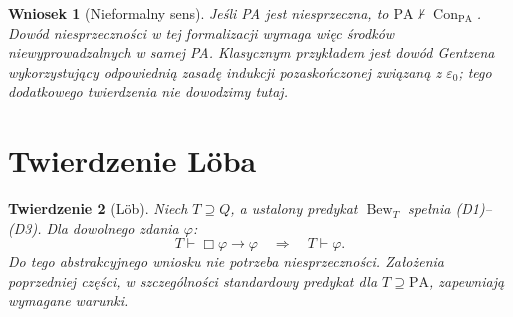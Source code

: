 \documentclass[11pt,a4paper]{article}
\numberwithin{equation}{section}
\theoremstyle{plain}
\newtheorem{twierdzenie}{Twierdzenie}[section]
\newtheorem{wniosek}[twierdzenie]{Wniosek}
\theoremstyle{definition}
\theoremstyle{remark}
\begin{document}
\begin{wniosek}[Nieformalny sens]\label{res:12:3}
Jeśli PA jest niesprzeczna, to $\mathrm{PA}\nvdash\operatorname{Con}_{\mathrm{PA}}$. Dowód niesprzeczności w tej formalizacji wymaga więc środków niewyprowadzalnych w samej PA. Klasycznym przykładem jest dowód Gentzena wykorzystujący odpowiednią zasadę indukcji pozaskończonej związaną z $\varepsilon_0$; tego dodatkowego twierdzenia nie dowodzimy tutaj.
\end{wniosek}

\section{Twierdzenie Löba}\label{sec:loeb}
\begin{twierdzenie}[Löb]\label{res:13:1}
Niech $T\supseteq Q$, a ustalony predykat $\operatorname{Bew}_T$ spełnia (D1)--(D3). Dla dowolnego zdania $\varphi$:
\[
T\vdash\Box\varphi\to\varphi\quad\Longrightarrow\quad T\vdash\varphi.
\]
Do tego abstrakcyjnego wniosku nie potrzeba niesprzeczności. Założenia poprzedniej części, w szczególności standardowy predykat dla $T\supseteq\mathrm{PA}$, zapewniają wymagane warunki.
\end{twierdzenie}
\end{document}
